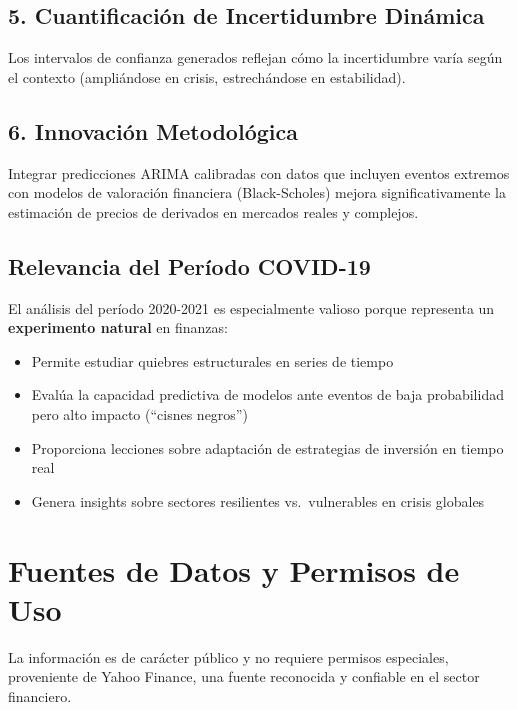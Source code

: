 \documentclass[
]{book}
\providecommand{\tightlist}{%
  \setlength{\itemsep}{0pt}\setlength{\parskip}{0pt}}
\begin{document}
\subsection{5. Cuantificación de Incertidumbre Dinámica}\label{cuantificaciuxf3n-de-incertidumbre-dinuxe1mica}

Los intervalos de confianza generados reflejan cómo la incertidumbre varía según el contexto (ampliándose en crisis, estrechándose en estabilidad).

\subsection{6. Innovación Metodológica}\label{innovaciuxf3n-metodoluxf3gica}

Integrar predicciones ARIMA calibradas con datos que incluyen eventos extremos con modelos de valoración financiera (Black-Scholes) mejora significativamente la estimación de precios de derivados en mercados reales y complejos.

\subsection{Relevancia del Período COVID-19}\label{relevancia-del-peruxedodo-covid-19}

El análisis del período 2020-2021 es especialmente valioso porque representa un \textbf{experimento natural} en finanzas:

\begin{itemize}
\tightlist
\item
  Permite estudiar quiebres estructurales en series de tiempo
\item
  Evalúa la capacidad predictiva de modelos ante eventos de baja probabilidad pero alto impacto (``cisnes negros'')
\item
  Proporciona lecciones sobre adaptación de estrategias de inversión en tiempo real
\item
  Genera insights sobre sectores resilientes vs.~vulnerables en crisis globales
\end{itemize}

\section{Fuentes de Datos y Permisos de Uso}\label{fuentes-de-datos-y-permisos-de-uso}

La información es de carácter público y no requiere permisos especiales, proveniente de Yahoo Finance, una fuente reconocida y confiable en el sector financiero.
\end{document}
